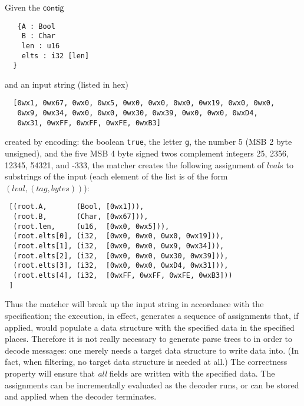 \documentclass[sigplan,10pt,anonymous,review]{acmart}\settopmatter{printfolios=true,printccs=false,printacmref=false}
\newcommand{\konst}[1]{\ensuremath{\mathsf{#1}}}
\begin{document}
\begin{example}
Given the \konst{contig}
\begin{verbatim}
   {A : Bool
    B : Char
    len : u16
    elts : i32 [len]
  }
\end{verbatim}
\noindent and an input string (listed in hex)
\begin{verbatim}
  [0wx1, 0wx67, 0wx0, 0wx5, 0wx0, 0wx0, 0wx0, 0wx19, 0wx0, 0wx0,
   0wx9, 0wx34, 0wx0, 0wx0, 0wx30, 0wx39, 0wx0, 0wx0, 0wxD4,
   0wx31, 0wxFF, 0wxFF, 0wxFE, 0wxB3]
\end{verbatim}
created by encoding: the boolean \verb+true+, the letter \verb+g+, the
number 5 (MSB 2 byte unsigned), and the five MSB 4 byte signed twos complement
integers 25, 2356, 12345, 54321, and -333, the matcher creates the
following assignment of $\mathit{lval}$s to substrings of the input
(each element of the list is of the form
$(\mathit{lval}, (\mathit{tag},\mathit{bytes}))$):

\begin{verbatim}
 [(root.A,       (Bool, [0wx1])),
  (root.B,       (Char, [0wx67])),
  (root.len,     (u16,  [0wx0, 0wx5])),
  (root.elts[0], (i32,  [0wx0, 0wx0, 0wx0, 0wx19])),
  (root.elts[1], (i32,  [0wx0, 0wx0, 0wx9, 0wx34])),
  (root.elts[2], (i32,  [0wx0, 0wx0, 0wx30, 0wx39])),
  (root.elts[3], (i32,  [0wx0, 0wx0, 0wxD4, 0wx31])),
  (root.elts[4], (i32,  [0wxFF, 0wxFF, 0wxFE, 0wxB3]))
 ]
\end{verbatim}

\end{example}

Thus the matcher will break up the input string in accordance with the
specification; the execution, in effect, generates a sequence of
assignments that, if applied, would populate a data structure with the
specified data in the specified places. Therefore it is not really
necessary to generate parse trees to in order to decode messages: one
merely needs a target data structure to write data into. (In fact,
when filtering, no target data structure is needed at all.) The
correctness property will ensure that \emph{all} fields are written
with the specified data. The assignments can be incrementally
evaluated as the decoder runs, or can be stored and applied when the
decoder terminates.
\end{document}
